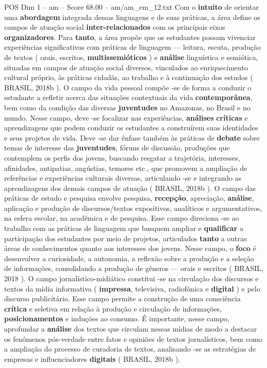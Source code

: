 \begin{textsample}{POS Dim 1 – am – Score 68.00 – am/am\_em\_12.txt}
Com o \textbf{intuito} de orientar uma \textbf{abordagem} integrada dessas linguagens e de suas práticas, a área define os campos de atuação social \textbf{inter-relacionados} com os principais eixos \textbf{organizadores}.
Para \textbf{tanto}, a área propõe que os estudantes possam vivenciar experiências significativas com práticas de linguagem — leitura, escuta, produção de textos ( orais, escritos, \textbf{multissemióticos} ) e \textbf{análise} linguística e semiótica, situadas em campos de atuação social diversos, vinculados ao enriquecimento cultural próprio, às práticas cidadãs, ao trabalho e à continuação dos estudos ( BRASIL, 2018b ).
O campo da vida pessoal compõe -se de forma a conduzir o estudante a refletir acerca das situações contextuais da vida \textbf{contemporânea}, bem como da condição das diversas \textbf{juventudes} no Amazonas, no Brasil e no mundo.
Nesse campo, deve -se focalizar nas experiências, \textbf{análises} \textbf{críticas} e aprendizagens que podem conduzir os estudantes a construírem suas identidades e seus projetos de vida.
Deve -se dar ênfase também às práticas de \textbf{debate} sobre temas de interesse das \textbf{juventudes}, fóruns de discussão, produções que contemplem os perfis dos jovens, buscando resgatar a trajetória, interesses, afinidades, antipatias, angústias, temores etc., que promovem a ampliação de referências e experiências culturais diversas, articulando -se e integrando as aprendizagens dos demais campos de atuação ( BRASIL, 2018b ).
O campo das práticas de estudo e pesquisa envolve pesquisa, \textbf{recepção}, apreciação, \textbf{análise}, aplicação e produção de discursos/textos expositivos, analíticos e argumentativos, na esfera escolar, na acadêmica e de pesquisa.
Esse campo direciona -se ao trabalho com as práticas de linguagem que busquem ampliar e \textbf{qualificar} a participação dos estudantes por meio de projetos, articulados \textbf{tanto} a outras áreas de conhecimentos quanto aos interesses dos jovens.
Nesse campo, o \textbf{foco} é desenvolver a curiosidade, a autonomia, a reflexão sobre a produção e a seleção de informações, consolidando a produção de gêneros — orais e escritos ( BRASIL, 2018 ).
O campo jornalístico-midiático constitui -se na circulação dos discursos e textos da mídia informativa ( \textbf{impressa}, televisiva, radiofônica e \textbf{digital} ) e pelo discurso publicitário.
Esse campo permite a construção de uma consciência \textbf{crítica} e seletiva em relação à produção e circulação de informações, \textbf{posicionamentos} e induções ao consumo.
É importante, nesse campo, aprofundar a \textbf{análise} dos textos que circulam nessas mídias de modo a destacar os fenômenos pós-verdade entre fatos e opiniões de textos jornalísticos, bem como a ampliação do processo de curadoria de textos, analisando -se as estratégias de empresas e influenciadores \textbf{digitais} ( BRASIL, 2018b ).

\end{textsample}
